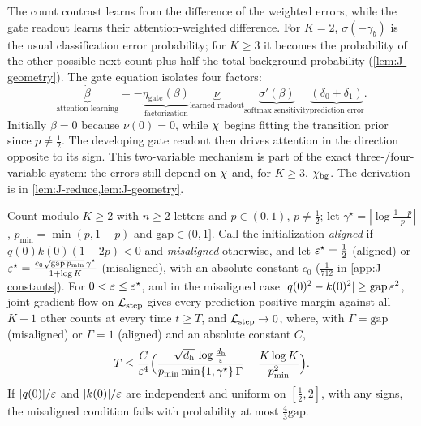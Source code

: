 The count contrast learns from the difference of the weighted errors, while the gate readout learns their attention-weighted
difference. For $K=2$, $\sigma(-\gamma_b)$ is the usual classification error probability; for $K\ge3$ it becomes the probability of the
other possible next count plus half the total background probability (\cref{lem:J-geometry}). The gate equation isolates four factors:
\[
 \boxed{\underbrace{\dot \beta}_{\text{attention learning}}
 =-\underbrace{\eta_{\mathrm{gate}}(\beta)}_{\text{factorization}}
 \underbrace{\nu}_{\text{learned readout}}
 \underbrace{\sigma'(\beta)}_{\text{softmax sensitivity}}
 \underbrace{(\delta_0+\delta_1)}_{\text{prediction error}}.}
\]
Initially $\dot \beta=0$ because $\nu(0)=0$, while $\chi$ begins fitting the transition prior since $p\ne\frac12$. The developing gate
readout then drives attention in the direction opposite to its sign. This two-variable mechanism is part of the exact
three-/four-variable system: the errors still depend on $\chi$ and, for $K\ge3$, $\chi_{\mathrm{bg}}$. The derivation is in \cref{lem:J-reduce,lem:J-geometry}.

\begin{theorem}
\label{thm:joint}
Count modulo $K\ge2$ with $n\ge2$ letters and $p\in(0,1)$, $p\neq\tfrac{1}{2}$; let $\gamma^\star=|\log\tfrac{1-p}{p}|$, $p_{\min}=\min(p,1-p)$ and
$\mathrm{gap}\in(0,1]$. Call the initialization \emph{aligned} if $q(0)k(0)(1-2p)<0$ and \emph{misaligned} otherwise, and let
$\initscale^\star=\tfrac{1}{2}$ (aligned) or $\varepsilon^\star=\frac{c_0\sqrt{\mathrm{gap}\,p_{\min}}\,\gamma^\star}{1+\log K}$ (misaligned), with an absolute constant $c_0$ ($\tfrac{1}{712}$ in \cref{app:J-constants}).
For $0<\varepsilon\le\varepsilon^\star$, and in the misaligned case $|q(0)^2-k(0)^2|\ge\mathrm{gap}\,\varepsilon^2$, joint gradient flow on $\mathcal L_{\mathrm{step}}$ gives
every prediction positive margin against all $K-1$ other counts at every time $t\ge T$, and $\mathcal L_{\mathrm{step}}\to0$, where, with $\Gamma=\mathrm{gap}$
(misaligned) or $\Gamma=1$ (aligned) and an absolute constant $C$,
\[
 T\le\frac{C}{\varepsilon^4}\Bigl(\frac{\sqrt{d_{\mathrm h}}\,\log\frac{d_{\mathrm h}}{\varepsilon}}{p_{\min}\min\{1,\gamma^\star\}\,\Gamma}+\frac{K\log K}{p_{\min}^2}\Bigr).
\]
If $|q(0)|/\varepsilon$ and $|k(0)|/\varepsilon$ are independent and uniform on $[\tfrac{1}{2},2]$, with any signs, the misaligned condition fails with
probability at most $\tfrac{4}{3}\mathrm{gap}$.
\end{theorem}


